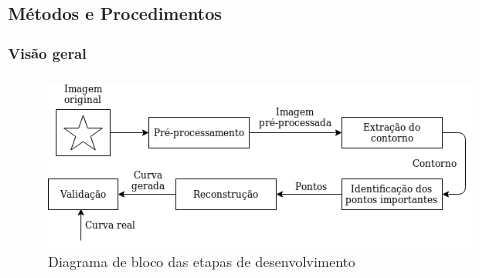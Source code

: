 \begin{frame}
\frametitle{Métodos e Procedimentos}
\framesubtitle{Visão geral}

\begin{figure}[hbt]
	\begin{center}
		\caption{Diagrama de bloco das etapas de desenvolvimento}
		\includegraphics[width=1\textwidth]{img/diagrama.png}
	\end{center}
\end{figure}

\end{frame}


